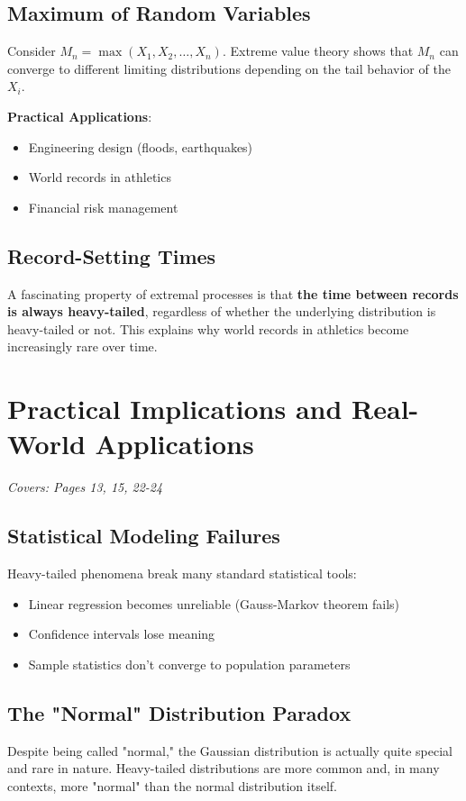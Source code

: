 \documentclass[11pt]{article}
\begin{document}
\subsection{Maximum of Random Variables}
Consider $M_n = \max(X_1, X_2, \ldots, X_n)$. Extreme value theory shows that $M_n$ can converge to different limiting distributions depending on the tail behavior of the $X_i$.

\textbf{Practical Applications}: 
\begin{itemize}
    \item Engineering design (floods, earthquakes)
    \item World records in athletics
    \item Financial risk management
\end{itemize}

\subsection{Record-Setting Times}
A fascinating property of extremal processes is that \textbf{the time between records is always heavy-tailed}, regardless of whether the underlying distribution is heavy-tailed or not. This explains why world records in athletics become increasingly rare over time.

\section{Practical Implications and Real-World Applications}
\textit{Covers: Pages 13, 15, 22-24}

\subsection{Statistical Modeling Failures}
Heavy-tailed phenomena break many standard statistical tools:
\begin{itemize}
    \item Linear regression becomes unreliable (Gauss-Markov theorem fails)
    \item Confidence intervals lose meaning
    \item Sample statistics don't converge to population parameters
\end{itemize}

\subsection{The "Normal" Distribution Paradox}
Despite being called "normal," the Gaussian distribution is actually quite special and rare in nature. Heavy-tailed distributions are more common and, in many contexts, more "normal" than the normal distribution itself.
\end{document}
